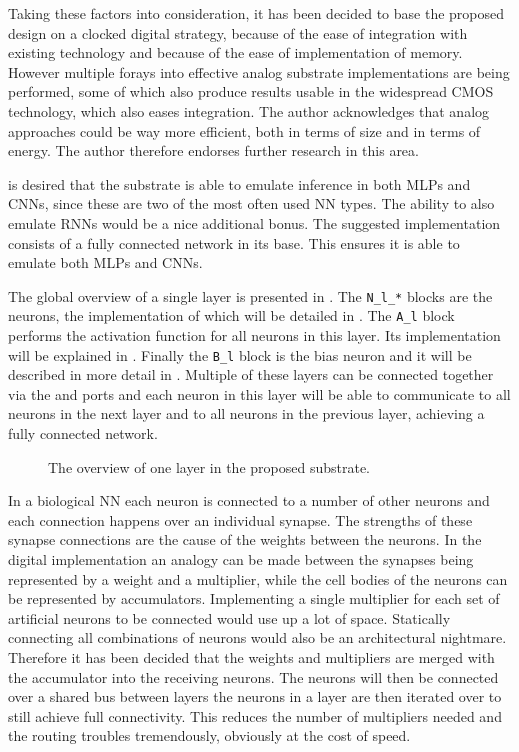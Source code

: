 Taking these factors into consideration, it has been decided to base the proposed design on a clocked digital strategy, because of the ease of integration with existing technology and because of the ease of implementation of memory. However multiple forays into effective analog substrate implementations are being performed, some of which also produce results usable in the widespread \ac{CMOS} technology, which also eases integration\cite{239745,81862,machofnewsoul}. The author acknowledges that analog approaches could be way more efficient, both in terms of size and in terms of energy. The author therefore endorses further research in this area.

 is desired that the substrate is able to emulate inference in both \acp{MLP} and \acp{CNN}, since these are two of the most often used \ac{NN} types\cite{8192463}. The ability to also emulate \acp{RNN} would be a nice additional bonus. The suggested implementation consists of a fully connected network in its base. This ensures it is able to emulate both \acp{MLP} and \acp{CNN}.

The global overview of a single layer is presented in . The \texttt{N\_l\_*} blocks are the neurons, the implementation of which will be detailed in . The \texttt{A\_l} block performs the activation function for all neurons in this layer. Its implementation will be explained in . Finally the \texttt{B\_l} block is the bias neuron and it will be described in more detail in . Multiple of these layers can be connected together via the  and  ports and each neuron in this layer will be able to communicate to all neurons in the next layer and to all neurons in the previous layer, achieving a fully connected network.

\begin{figure*}[!ht]
  \centering
  
  \caption{The overview of one layer in the proposed substrate.}
  \label{fig:layer}
\end{figure*}

In a biological \ac{NN} each neuron is connected to a number of other neurons and each connection happens over an individual synapse. The strengths of these synapse connections are the cause of the weights between the neurons. In the digital implementation an analogy can be made between the synapses being represented by a weight and a multiplier, while the cell bodies of the neurons can be represented by accumulators. Implementing a single multiplier for each set of artificial neurons to be connected would use up a lot of space. Statically connecting all combinations of neurons would also be an architectural nightmare. Therefore it has been decided that the weights and multipliers are merged with the accumulator into the receiving neurons. The neurons will then be connected over a shared bus between layers the neurons in a layer are then iterated over to still achieve full connectivity. This reduces the number of multipliers needed and the routing troubles tremendously, obviously at the cost of speed.

